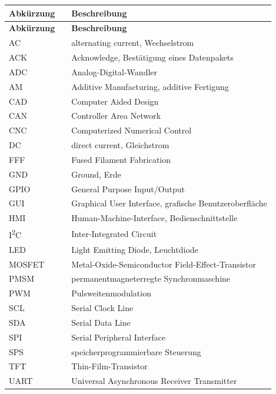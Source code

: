 {\begin{xltabular}{15.1cm}{llX}
	\textbf{Abkürzung} &  & \textbf{Beschreibung} \\
	\hline
	\endfirsthead
	\textbf{Abkürzung} &  & \textbf{Beschreibung} \\
	\hline
	\endhead
	AC & & alternating current, Wechselstrom \bigstrut[t] \\
	ACK & & Acknowledge, Bestätigung eines Datenpakets \\
	ADC & & Analog-Digital-Wandler \\
	AM & & Additive Manufacturing, additive Fertigung \\
	CAD & & Computer Aided Design \\
	CAN & & Controller Area Network \\
	CNC & & Computerized Numerical Control \\
	DC & & direct current, Gleichstrom \\
	FFF & & Fused Filament Fabrication \\
	GND & & Ground, Erde \\
	GPIO & & General Purpose Input/Output \\
	GUI & & Graphical User Interface, grafische Benutzeroberfläche \\
	HMI & & Human-Machine-Interface, Bedienschnittstelle \\
	I\textsuperscript{2}C & & Inter-Integrated Circuit \\
	LED & & Light Emitting Diode, Leuchtdiode \\
	MOSFET & & Metal-Oxide-Semiconductor Field-Effect-Transistor \\
	PMSM & & permanentmagneterregte Synchronmaschine \\
	PWM & & Pulsweitenmodulation \\
	SCL & & Serial Clock Line \\
	SDA & & Serial Data Line \\
	SPI & & Serial Peripheral Interface \\
	SPS & & speicherprogrammierbare Steuerung \\
	TFT & & Thin-Film-Transistor \\
	UART & & Universal Asynchronous Receiver Transmitter \bigstrut[b] \\
\end{xltabular}
}
